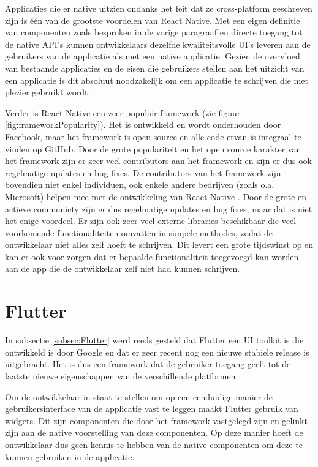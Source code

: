 Applicaties die er native uitzien ondanks het feit dat ze cross-platform geschreven zijn is één van de grootste voordelen van React Native. Met een eigen definitie van componenten zoals besproken in de vorige paragraaf en directe toegang tot de native API's kunnen ontwikkelaars dezelfde kwaliteitsvolle UI's leveren aan de gebruikers van de applicatie als met een native applicatie. Gezien de overvloed van bestaande applicaties en de eisen die gebruikers stellen aan het uitzicht van een applicatie is dit absoluut noodzakelijk om een applicatie te schrijven die met plezier gebruikt wordt.

Verder is React Native een zeer populair framework (zie figuur \ref{fig:frameworkPopularity}). Het is ontwikkeld en wordt onderhouden door Facebook, maar het framework is open source en alle code ervan is integraal te vinden op GitHub. Door de grote populariteit en het open source karakter van het framework zijn er zeer veel contributors aan het framework en zijn er dus ook regelmatige updates en bug fixes. De contributors van het framework zijn bovendien niet enkel individuen, ook enkele andere bedrijven (zoals o.a. Microsoft) helpen mee met de ontwikkeling van React Native \autocite{Nakazawa2019}. Door de grote en actieve communicty zijn er dus regelmatige updates en bug fixes, maar dat is niet het enige voordeel. Er zijn ook zeer veel externe libraries beschikbaar die veel voorkomende functionaliteiten omvatten in simpele methodes, zodat de ontwikkelaar niet alles zelf hoeft te schrijven. Dit levert een grote tijdswinst op en kan er ook voor zorgen dat er bepaalde functionaliteit toegevoegd kan worden aan de app die de ontwikkelaar zelf niet had kunnen schrijven.


\section{Flutter}
\label{detailsFlutter}

In subsectie \ref{subsec:Flutter} werd reeds gesteld dat Flutter een UI toolkit is die ontwikkeld is door Google en dat er zeer recent nog een nieuwe stabiele release is uitgebracht. Het is dus een framework dat de gebruiker toegang geeft tot de laatste nieuwe eigenschappen van de verschillende platformen.

Om de ontwikkelaar in staat te stellen om op een eenduidige manier de gebruikersinterface van de applicatie vast te leggen maakt Flutter gebruik van widgets. Dit zijn componenten die door het framework vastgelegd zijn en gelinkt zijn aan de native voorstelling van deze componenten. Op deze manier hoeft de ontwikkelaar dus geen kennis te hebben van de native componenten om deze te kunnen gebruiken in de applicatie. 

